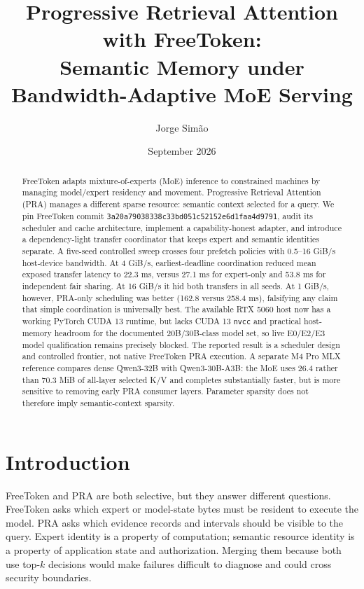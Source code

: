 \documentclass[10pt]{article}
\title{Progressive Retrieval Attention with FreeToken:\\
Semantic Memory under Bandwidth-Adaptive MoE Serving}
\author{Jorge Sim\~ao}
\date{September 2026}
\begin{document}
\maketitle

\begin{abstract}
FreeToken adapts mixture-of-experts (MoE) inference to constrained machines by
managing model/expert residency and movement. Progressive Retrieval Attention
(PRA) manages a different sparse resource: semantic context selected for a
query. We pin FreeToken commit
\texttt{3a20a79038338c33bd051c52152e6d1faa4d9791}, audit its scheduler and cache
architecture, implement a capability-honest adapter, and introduce a
dependency-light transfer coordinator that keeps expert and semantic identities
separate. A five-seed controlled sweep crosses four prefetch policies with
0.5--16 GiB/s host-device bandwidth. At 4 GiB/s, earliest-deadline coordination
reduced mean exposed transfer latency to 22.3 ms, versus 27.1 ms for expert-only
and 53.8 ms for independent fair sharing. At 16 GiB/s it hid both transfers in
all seeds. At 1 GiB/s, however, PRA-only scheduling was better (162.8 versus
258.4 ms), falsifying any claim that simple coordination is universally best.
The available RTX 5060 host now has a working PyTorch CUDA 13 runtime, but lacks
CUDA 13 \texttt{nvcc} and practical host-memory headroom for the documented
20B/30B-class model set, so live E0/E2/E3 model qualification remains precisely
blocked. The reported result is a scheduler design and controlled
frontier, not native FreeToken PRA execution. A separate M4 Pro MLX reference
compares dense Qwen3-32B with Qwen3-30B-A3B: the MoE uses 26.4 rather than
70.3 MiB of all-layer selected K/V and completes substantially faster, but is
more sensitive to removing early PRA consumer layers. Parameter sparsity does
not therefore imply semantic-context sparsity.
\end{abstract}

\section{Introduction}
FreeToken and PRA are both selective, but they answer different questions.
FreeToken asks which expert or model-state bytes must be resident to execute the
model. PRA asks which evidence records and intervals should be visible to the
query. Expert identity is a property of computation; semantic resource identity
is a property of application state and authorization. Merging them because both
use top-$k$ decisions would make failures difficult to diagnose and could cross
security boundaries.
\end{document}
